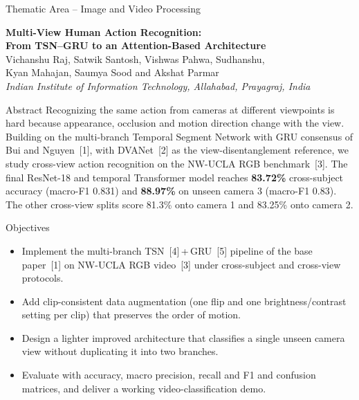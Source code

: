 \documentclass{article}
\begin{document}
{\fontsize{26}{30}\selectfont\color{hdrL}\hfill Thematic Area -- Image and Video Processing\hfill{}}\\[3mm]
\begin{center}
{\fontsize{62}{71}\selectfont\bfseries\color{titleblue}Multi-View Human Action Recognition:\\[2mm]
From TSN--GRU to an Attention-Based Architecture}\\[5mm]
{\fontsize{29}{35}\selectfont\color{black}Vichanshu Raj, Satwik Santosh, Vishwas Pahwa, Sudhanshu,\\[1mm]
Kyan Mahajan, Saumya Sood and Akshat Parmar}\\[4mm]
{\fontsize{25}{30}\selectfont\itshape\color{black}Indian Institute of Information Technology, Allahabad, Prayagraj, India}
\end{center}
\vspace{-2mm}

\begin{tcbraster}[raster columns=2,raster equal height=rows,raster column skip=8mm,raster after skip=4mm]
\begin{psec}[after skip=0pt]{Abstract}
Recognizing the same action from cameras at different viewpoints is hard because appearance, occlusion and motion direction change with the view. Building on the multi-branch Temporal Segment Network with GRU consensus of Bui and Nguyen~[1], with DVANet~[2] as the view-disentanglement reference, we study cross-view action recognition on the NW-UCLA RGB benchmark~[3]. The final ResNet-18 and temporal Transformer model reaches \textbf{83.72\%} cross-subject accuracy (macro-F1 0.831) and \textbf{88.97\%} on unseen camera 3 (macro-F1 0.83). The other cross-view splits score 81.3\% onto camera 1 and 83.25\% onto camera 2.
\end{psec}
\begin{psec}[after skip=0pt]{Objectives}
\begin{itemize}
\item Implement the multi-branch TSN~[4]\,+\,GRU~[5] pipeline of the base paper~[1] on NW-UCLA RGB video~[3] under cross-subject and cross-view protocols.
\item Add clip-consistent data augmentation (one flip and one brightness/contrast setting per clip) that preserves the order of motion.
\item Design a lighter improved architecture that classifies a single unseen camera view without duplicating it into two branches.
\item Evaluate with accuracy, macro precision, recall and F1 and confusion matrices, and deliver a working video-classification demo.
\end{itemize}
\end{psec}
\end{tcbraster}
\end{document}

